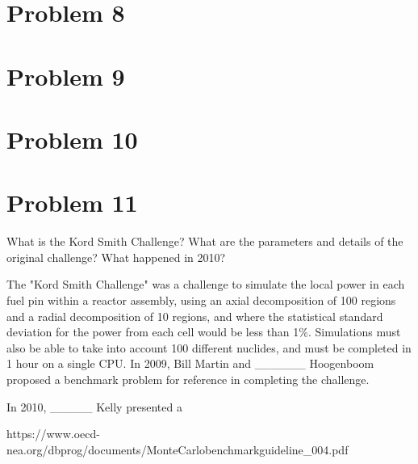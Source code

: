 \documentclass{article}
\begin{document}

\section*{Problem 8}





\section*{Problem 9}





\section*{Problem 10}





\section*{Problem 11}

What is the Kord Smith Challenge? What are the parameters and details of the original challenge? What happened in 2010?

The "Kord Smith Challenge" was a challenge to simulate the local power in each fuel pin within a reactor assembly, using an axial decomposition of 100 regions and a radial decomposition of 10 regions, and where the statistical standard deviation for the power from each cell would be less than 1\%. Simulations must also be able to take into account 100 different nuclides, and must be completed in 1 hour on a single CPU. In 2009, Bill Martin and ______ Hoogenboom proposed a benchmark problem for reference in completing the challenge. 

In 2010, _____ Kelly presented a 

https://www.oecd-nea.org/dbprog/documents/MonteCarlobenchmarkguideline_004.pdf




\end{document}

